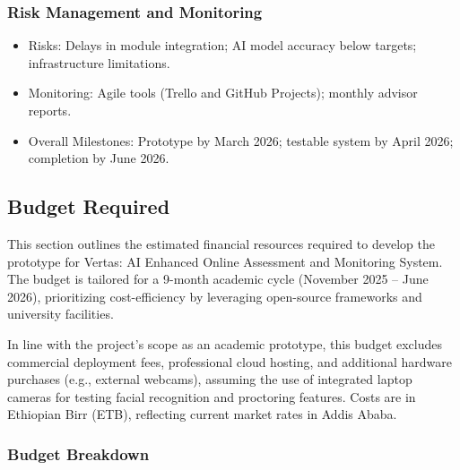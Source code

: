 \subsubsection{Risk Management and Monitoring}
\begin{itemize} 
    \item Risks: Delays in module integration; AI model accuracy below targets; infrastructure limitations.
    \item Monitoring: Agile tools (Trello and GitHub Projects); monthly advisor reports.
    \item Overall Milestones: Prototype by March 2026; testable system by April 2026; completion by June 2026.
\end{itemize}

\subsection{Budget Required}
This section outlines the estimated financial resources required to develop the prototype for Vertas: AI Enhanced Online Assessment and Monitoring System. The budget is tailored for a 9-month academic cycle (November 2025 – June 2026), prioritizing cost-efficiency by leveraging open-source frameworks and university facilities.

In line with the project’s scope as an academic prototype, this budget excludes commercial deployment fees, professional cloud hosting, and additional hardware purchases (e.g., external webcams), assuming the use of integrated laptop cameras for testing facial recognition and proctoring features. Costs are in Ethiopian Birr (ETB), reflecting current market rates in Addis Ababa.

\subsubsection{Budget Breakdown}

